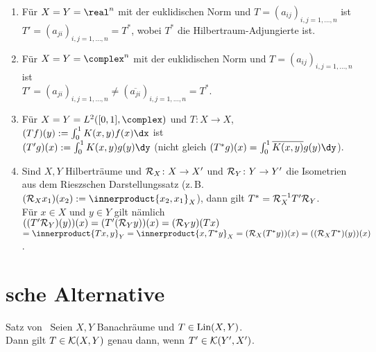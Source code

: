 \begin{Bsp}
    \begin{enumerate}[label=\emph{(\alph*)}]
        \item
        Für $X = Y = \real^n$ mit der euklidischen Norm und
        $T = (a_{ij})_{i,j=1,\dotsc,n}$ ist\\
        $T' = (a_{ji})_{i,j=1,\dotsc,n} = T^\ast$,
        wobei $T^\ast$ die Hilbertraum-Adjungierte ist.

        \item
        Für $X = Y = \complex^n$ mit der euklidischen Norm und
        $T = (a_{ij})_{i,j=1,\dotsc,n}$ ist\\
        $T' = (a_{ji})_{i,j=1,\dotsc,n} \not= (\overline{a_{ji}})_{i,j=1,\dotsc,n} = T^\ast$.

        \item
        Für $X = Y = L^2([0,1], \complex)$ und
        $T\colon X \rightarrow X$,
        $(Tf)(y) := \int_0^1 K(x, y)f(x)\dx$ ist\\
        $(T'g)(x) := \int_0^1 K(x, y)g(y)\dy$
        (nicht gleich
        $(T^\ast g)(x) = \int_0^1 \overline{K(x, y)} g(y) \dy$).

        \item
        Sind $X, Y$ Hilberträume und $\mathcal{R}_X\colon X \rightarrow X'$ und
        $\mathcal{R}_Y\colon Y \rightarrow Y'$ die Isometrien aus dem Rieszschen Darstellungssatz
        (z.\,B. $(\R_X x_1)(x_2) := \innerproduct{x_2, x_1}_X$),
        dann gilt $T^\ast = \mathcal{R}_X^{-1} T' \mathcal{R}_Y$.\\
        Für $x \in X$ und $y \in Y$ gilt nämlich
        $((T' \mathcal{R}_Y)(y))(x)
        = (T'(\mathcal{R}_Y y))(x)
        = (\mathcal{R}_Y y)(Tx)$\\
        $= \innerproduct{Tx, y}_Y
        = \innerproduct{x, T^\ast y}_X
        = (\R_X (T^\ast y))(x)
        = ((\R_X T^\ast)(y))(x)$.
    \end{enumerate}
\end{Bsp}

\pagebreak

\section{%
    sche Alternative%
}

\begin{Satz}{Satz von \scshape\,\!}
    Seien $X, Y$ Banachräume und $T \in \operatorname{Lin}(X, Y)$.\\
    Dann gilt $T \in \mathcal{K}(X, Y)$ genau dann, wenn $T' \in \mathcal{K}(Y', X')$.
\end{Satz}

